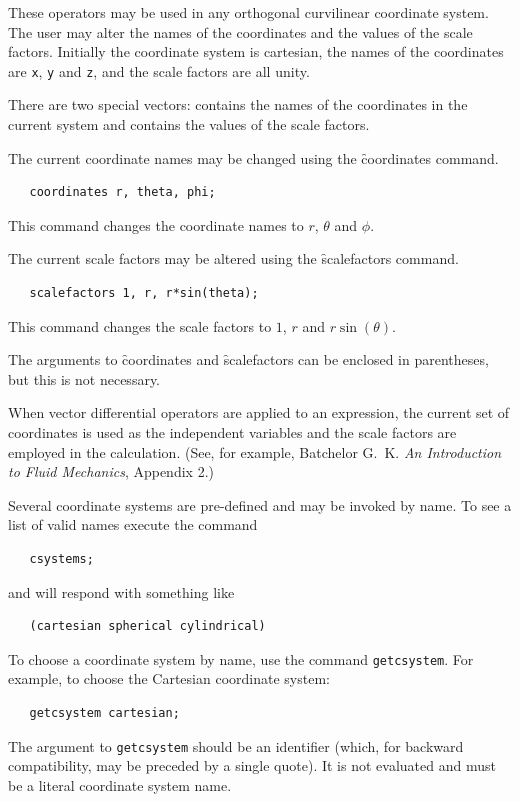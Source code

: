 These operators may be used in any orthogonal curvilinear coordinate
system. The user may alter the names of the coordinates and the values
of the scale factors. Initially the coordinate system is cartesian,
the names of the coordinates are \texttt{x}, \texttt{y}
and \texttt{z}, and the scale factors are all unity.

 
\hypertarget{reserved:COORDS}{}
\hypertarget{reserved:HFACTORS}{}
There are two special vectors:  contains the names
of the coordinates in the current system and 
contains the values of the scale factors.

\hypertarget{operator:COORDINATES}{}
The current coordinate names may be changed using the \f{coordinates}
command.
\begin{verbatim}
   coordinates r, theta, phi;
\end{verbatim}
This command changes the coordinate names to $r$, $\theta$ and $\phi$.

\hypertarget{operator:SCALEFACTORS}{}
The current scale factors may be altered using the \f{scalefactors}
command.
\begin{verbatim}
   scalefactors 1, r, r*sin(theta);
\end{verbatim}
This command changes the scale factors to $1$, $r$ and
$r\sin(\theta)$.

The arguments to \f{coordinates} and \f{scalefactors} can be enclosed
in parentheses, but this is not necessary.

When vector differential operators are applied to an expression,
the current set of coordinates is used as the independent
variables and the scale factors are employed in the calculation.
(See, for example, Batchelor G.~K. \textit{An Introduction to Fluid
Mechanics}, Appendix 2.)

\hypertarget{command:CSYSTEMS}{}
Several coordinate systems are pre-defined and may be invoked by
name. To see a list of valid names execute the command
\begin{verbatim}
   csystems;
\end{verbatim}
and \REDUCE will respond with something like
\begin{verbatim}
   (cartesian spherical cylindrical)
\end{verbatim}

\hypertarget{command:GETCSYSTEM}{}
To choose a coordinate system by name, use the command \texttt{getcsystem}.
For example, to choose the Cartesian coordinate system:
\begin{verbatim}
   getcsystem cartesian;
\end{verbatim}
\hypertarget{command:PUTCSYSTEM}{}
The argument to \texttt{getcsystem} should be an identifier (which,
for backward compatibility, may be preceded by a single quote).  It is
not evaluated and must be a literal coordinate system name.

